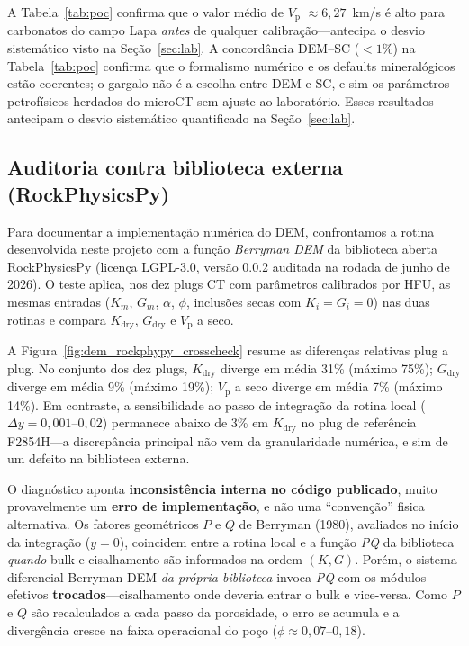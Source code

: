 \documentclass[11pt,a4paper]{article}
\numberwithin{equation}{section}
\newcommand{\Vp}{\ensuremath{V_{\mathrm{p}}}}
\begin{document}
A Tabela~\ref{tab:poc} confirma que o valor médio de \Vp{} $\approx 6{,}27$~km/s é alto para carbonatos do campo Lapa
\emph{antes} de qualquer calibração---antecipa o desvio sistemático
visto na Seção~\ref{sec:lab}.
A concordância DEM--SC ($<1\%$) na Tabela~\ref{tab:poc} confirma que o
formalismo numérico e os defaults mineralógicos estão coerentes; o
gargalo não é a escolha entre DEM e SC, e sim os parâmetros
petrofísicos herdados do microCT sem ajuste ao laboratório.
Esses resultados antecipam o desvio sistemático quantificado na
Seção~\ref{sec:lab}.

\subsection{Auditoria contra biblioteca externa (RockPhysicsPy)}
\label{sec:crosscheck_rockphypy}

Para documentar a implementação numérica do DEM, confrontamos a rotina
desenvolvida neste projeto com a função \emph{Berryman DEM} da biblioteca
aberta RockPhysicsPy (licença LGPL-3.0, versão 0.0.2 auditada na rodada
de junho de 2026).
O teste aplica, nos dez plugs CT com parâmetros calibrados por HFU, as mesmas
entradas ($K_m$, $G_m$, $\alpha$, $\phi$, inclusões secas com
$K_i = G_i = 0$) nas duas rotinas e compara $K_{\mathrm{dry}}$, $G_{\mathrm{dry}}$
e \Vp{} a seco.

A Figura~\ref{fig:dem_rockphypy_crosscheck} resume as diferenças relativas
plug a plug.
No conjunto dos dez plugs, $K_{\mathrm{dry}}$ diverge em média 31\% (máximo
75\%); $G_{\mathrm{dry}}$ diverge em média 9\% (máximo 19\%); \Vp{} a seco
diverge em média 7\% (máximo 14\%).
Em contraste, a sensibilidade ao passo de integração da rotina local
($\Delta y = 0{,}001$--$0{,}02$) permanece abaixo de 3\% em $K_{\mathrm{dry}}$
no plug de referência F2854H---a discrepância principal não vem da
granularidade numérica, e sim de um defeito na biblioteca externa.

O diagnóstico aponta \textbf{inconsistência interna no código publicado},
muito provavelmente um \textbf{erro de implementação}, e não uma
``convenção'' fisica alternativa.
Os fatores geométricos $P$ e $Q$ de Berryman (1980), avaliados no início da
integração ($y = 0$), coincidem entre a rotina local e a função
\emph{PQ} da biblioteca \emph{quando} bulk e cisalhamento são informados na
ordem $(K, G)$.
Porém, o sistema diferencial Berryman DEM \emph{da própria biblioteca}
invoca \emph{PQ} com os módulos efetivos \textbf{trocados}---cisalhamento
onde deveria entrar o bulk e vice-versa.
Como $P$ e $Q$ são recalculados a cada passo da porosidade, o erro se
acumula e a divergência cresce na faixa operacional do poço
($\phi \approx 0{,}07$--$0{,}18$).
\end{document}
